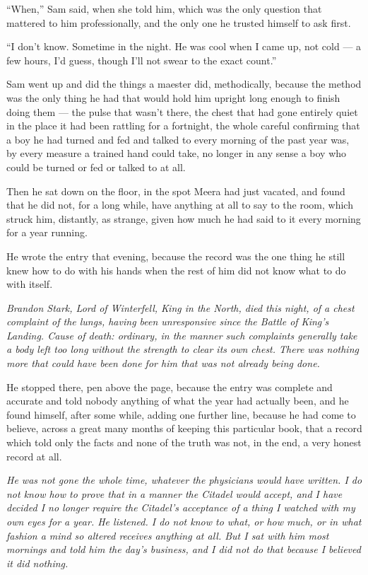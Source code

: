 \sceneBreak

“When,” Sam said, when she told him, which was the only question that mattered to him professionally, and the only one he trusted himself to ask first.

“I don’t know. Sometime in the night. He was cool when I came up, not cold — a few hours, I’d guess, though I’ll not swear to the exact count.”

Sam went up and did the things a maester did, methodically, because the method was the only thing he had that would hold him upright long enough to finish doing them — the pulse that wasn’t there, the chest that had gone entirely quiet in the place it had been rattling for a fortnight, the whole careful confirming that a boy he had turned and fed and talked to every morning of the past year was, by every measure a trained hand could take, no longer in any sense a boy who could be turned or fed or talked to at all.

Then he sat down on the floor, in the spot Meera had just vacated, and found that he did not, for a long while, have anything at all to say to the room, which struck him, distantly, as strange, given how much he had said to it every morning for a year running.

\sceneBreak

He wrote the entry that evening, because the record was the one thing he still knew how to do with his hands when the rest of him did not know what to do with itself.

\textit{Brandon Stark, Lord of Winterfell, King in the North, died this night, of a chest complaint of the lungs, having been unresponsive since the Battle of King’s Landing. Cause of death: ordinary, in the manner such complaints generally take a body left too long without the strength to clear its own chest. There was nothing more that could have been done for him that was not already being done.}

He stopped there, pen above the page, because the entry was complete and accurate and told nobody anything of what the year had actually been, and he found himself, after some while, adding one further line, because he had come to believe, across a great many months of keeping this particular book, that a record which told only the facts and none of the truth was not, in the end, a very honest record at all.

\textit{He was not gone the whole time, whatever the physicians would have written. I do not know how to prove that in a manner the Citadel would accept, and I have decided I no longer require the Citadel’s acceptance of a thing I watched with my own eyes for a year. He listened. I do not know to what, or how much, or in what fashion a mind so altered receives anything at all. But I sat with him most mornings and told him the day’s business, and I did not do that because I believed it did nothing.}

